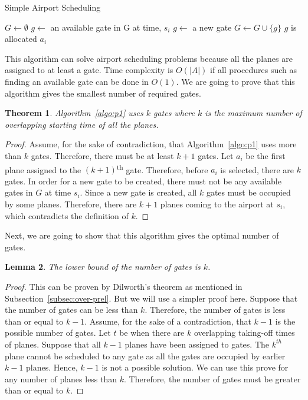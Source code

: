 \documentclass[11pt,a4paper]{article}
\newtheorem{theorem}{Theorem}[section]
\newtheorem{lemma}[theorem]{Lemma}
\begin{document}
\begin{algorithm}
\caption{Simple Airport Scheduling} \label{algo:p1}
\begin{algorithmic}
\STATE $G \gets \emptyset$
	\STATE $g \gets $ an available gate in G at time, $s_i$
		\STATE $g \gets $ a new gate
		\STATE $G \gets G \cup \{g\}$
	\ENDIF
	\STATE $g$ is allocated $a_i$
\ENDFOR
\end{algorithmic}
\end{algorithm}

This algorithm can solve airport scheduling problems because all the planes are assigned to at least a gate. Time complexity is $O(|A|)$ if all procedures such as finding an available gate can be done in $O(1)$. We are going to prove that this algorithm gives the smallest number of required gates. \par
\begin{theorem}
Algorithm~\ref{algo:p1} uses $k$ gates where $k$ is the maximum number of overlapping starting time of all the planes.
\end{theorem}
\begin{proof}
Assume, for the sake of contradiction, that Algorithm~\ref{algo:p1} uses more than $k$ gates. Therefore, there must be at least $k+1$ gates. Let $a_i$ be the first plane assigned to the $(k+1)$\textsuperscript{th} gate. Therefore, before $a_i$ is selected, there are $k$ gates. In order for a new gate to be created, there must not be any available gates in $G$ at time $s_i$. Since a new gate is created, all $k$ gates must be occupied by some planes. Therefore, there are $k+1$ planes coming to the airport at $s_i$, which contradicts the definition of $k$.
\end{proof}
Next, we are going to show that this algorithm gives the optimal number of gates.
\begin{lemma}
The lower bound of the number of gates is $k$.
\end{lemma}
\begin{proof}
This can be proven by Dilworth's theorem as mentioned in Subsection~\ref{subsec:over-prel}. But we will use a simpler proof here. Suppose that the number of gates can be less than $k$. Therefore, the number of gates is less than or equal to $k-1$. Assume, for the sake of a contradiction, that $k-1$ is the possible number of gates. Let $t$ be when there are $k$ overlapping taking-off times of planes. Suppose that all $k-1$ planes have been assigned to gates. The $k^{th}$ plane cannot be scheduled to any gate as all the gates are occupied by earlier $k-1$ planes. Hence, $k-1$ is not a possible solution. We can use this prove for any number of planes less than $k$. Therefore, the number of gates must be greater than or equal to $k$.
\end{proof}
\end{document}
